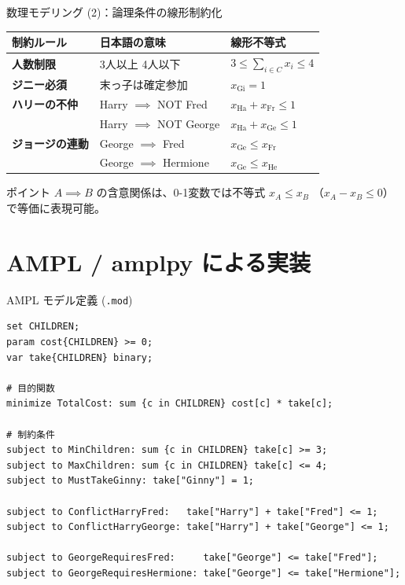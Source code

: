 \documentclass[aspectratio=169,11pt]{beamer}
\begin{document}
\begin{frame}{数理モデリング (2)：論理条件の線形制約化}
  \begin{table}[h]
    \centering
    \small
    \begin{tabularx}{\textwidth}{lXl}
      \toprule
      制約ルール & 日本語の意味 & 線形不等式 \\
      \midrule
      \textbf{人数制限} & 3人以上 4人以下 & $3 \le \sum_{i \in C} x_i \le 4$ \\
      \midrule
      \textbf{ジニー必須} & 末っ子は確定参加 & $x_{\text{Gi}} = 1$ \\
      \midrule
      \textbf{ハリーの不仲} & Harry $\implies$ NOT Fred & $x_{\text{Ha}} + x_{\text{Fr}} \le 1$ \\
      & Harry $\implies$ NOT George & $x_{\text{Ha}} + x_{\text{Ge}} \le 1$ \\
      \midrule
      \textbf{ジョージの連動} & George $\implies$ Fred & $x_{\text{Ge}} \le x_{\text{Fr}}$ \\
      & George $\implies$ Hermione & $x_{\text{Ge}} \le x_{\text{He}}$ \\
      \bottomrule
    \end{tabularx}
  \end{table}

  \begin{exampleblock}{ポイント}
    $A \implies B$ の含意関係は、0-1変数では不等式 $x_A \le x_B$ （$x_A - x_B \le 0$）で等価に表現可能。
  \end{exampleblock}
\end{frame}

\section{AMPL / amplpy による実装}

\begin{frame}[fragile]{AMPL モデル定義 (\texttt{.mod})}
\begin{lstlisting}
set CHILDREN;
param cost{CHILDREN} >= 0;
var take{CHILDREN} binary;

# 目的関数
minimize TotalCost: sum {c in CHILDREN} cost[c] * take[c];

# 制約条件
subject to MinChildren: sum {c in CHILDREN} take[c] >= 3;
subject to MaxChildren: sum {c in CHILDREN} take[c] <= 4;
subject to MustTakeGinny: take["Ginny"] = 1;

subject to ConflictHarryFred:   take["Harry"] + take["Fred"] <= 1;
subject to ConflictHarryGeorge: take["Harry"] + take["George"] <= 1;

subject to GeorgeRequiresFred:     take["George"] <= take["Fred"];
subject to GeorgeRequiresHermione: take["George"] <= take["Hermione"];
\end{lstlisting}
\end{frame}
\end{document}
